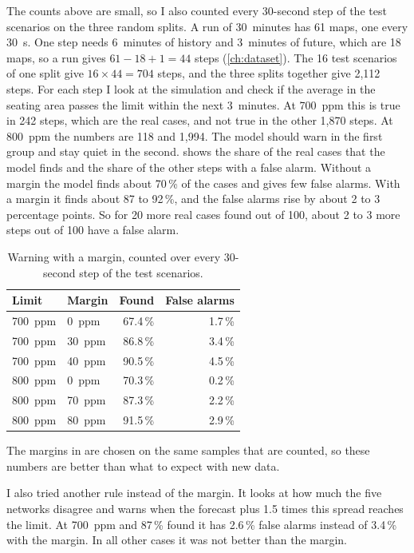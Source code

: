 The counts above are small, so I also counted every 30-second step of the test scenarios on the three random
splits. A run of 30~minutes has 61 \cotwo{} maps, one every 30~s. One step needs 6~minutes of history and
3~minutes of future, which are 18 maps, so a run gives $61-18+1=44$ steps (\cref{ch:dataset}). The 16 test
scenarios of one split give $16\times44=704$ steps, and the three splits together give 2,112 steps. For each step I
look at the simulation and check if the average \cotwo{} in the seating area passes the limit within the next
3~minutes. At 700~ppm this is true in 242 steps, which are the real cases, and not true in the other 1,870 steps.
At 800~ppm the numbers are 118 and 1,994. The model should warn in the first group and stay quiet in the second.
 shows the share of the real cases that the model finds and the share of the other steps
with a false alarm. Without a margin the model finds about 70\,\% of the cases and gives few false alarms. With a
margin it finds about 87 to 92\,\%, and the false alarms rise by about 2 to 3 percentage points. So for 20 more
real cases found out of 100, about 2 to 3 more steps out of 100 have a false alarm.

\begin{table}[h]
  \centering
  \caption[Found and false alarms.]{Warning with a margin, counted over every 30-second step of the test scenarios.}
  \label{tab:rate}
  \small
  \begin{tabular}{llrr}
    \toprule
    Limit & Margin & Found & False alarms\\
    \midrule
    700~ppm & 0~ppm & 67.4\,\% & 1.7\,\%\\
    700~ppm & 30~ppm & 86.8\,\% & 3.4\,\%\\
    700~ppm & 40~ppm & 90.5\,\% & 4.5\,\%\\
    800~ppm & 0~ppm & 70.3\,\% & 0.2\,\%\\
    800~ppm & 70~ppm & 87.3\,\% & 2.2\,\%\\
    800~ppm & 80~ppm & 91.5\,\% & 2.9\,\%\\
    \bottomrule
  \end{tabular}
\end{table}

The margins in  are chosen on the same samples that are counted, so these numbers are better than
what to expect with new data.

I also tried another rule instead of the margin. It looks at how much the five networks disagree and warns when
the forecast plus 1.5 times this spread reaches the limit. At 700~ppm and 87\,\% found it has 2.6\,\% false alarms
instead of 3.4\,\% with the margin. In all other cases it was not better than the margin.

